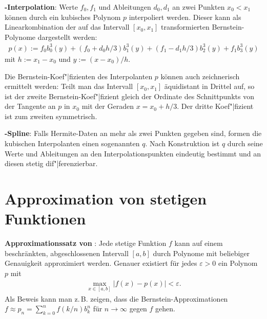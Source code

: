 \textbf{-Interpolation}:
Werte $f_0, f_1$ und Ableitungen $d_0, d_1$ an zwei Punkten $x_0 < x_1$ können durch ein
kubisches Polynom $p$ interpoliert werden.
Dieser  kann als Linearkombination der auf das Intervall
$[x_0, x_1]$ transformierten Bernstein-Polynome dargestellt werden:
\begin{align*}
    p(x) := f_0 b_0^3(y) + (f_0 + d_0 h/3) b_1^3(y) + (f_1 - d_1 h/3) b_2^3(y) + f_1 b_3^3(y)
\end{align*}
mit $h := x_1 - x_0$ und $y := (x - x_0)/h$.

Die Bernstein-Koef"|fizienten des Interpolanten $p$ können auch zeichnerisch ermittelt werden:
Teilt man das Intervall $[x_0, x_1]$ äquidistant in Drittel auf, so ist der zweite
Bernstein-Koef"|fizient gleich der Ordinate des Schnittpunkts von der Tangente an $p$ in $x_0$
mit der Geraden $x = x_0 + h/3$.
Der dritte Koef"|fizient ist zum zweiten symmetrisch.

\linie

\textbf{-Spline}:
Falls Hermite-Daten an mehr als zwei Punkten gegeben sind, formen die kubischen Interpolanten
einen sogenannten  $q$.
Nach Konstruktion ist $q$ durch seine Werte und Ableitungen an den
Interpolationspunkten eindeutig bestimmt und an diesen stetig dif"|ferenzierbar.

\section{%
    Approximation von stetigen Funktionen%
}

\textbf{Approximationssatz von }:
Jede stetige Funktion $f$ kann auf einem beschränkten, abgeschlossenen Intervall $[a, b]$
durch Polynome mit beliebiger Genauigkeit approximiert werden.
Genauer existiert für jedes $\varepsilon > 0$ ein Polynom $p$ mit
\begin{align*}
    \max_{x \in [a, b]} |f(x) - p(x)| < \varepsilon.
\end{align*}
Als Beweis kann man z.\,B. zeigen,
dass die Bernstein-Approximationen\\
$f \approx p_n = \sum_{k=0}^n f(k/n) b_k^n$ für $n \to \infty$ gegen $f$ gehen.

\pagebreak
